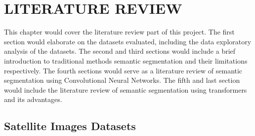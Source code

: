 
\chapter{LITERATURE REVIEW}
\label{chapter: 2}

This chapter would cover the literature review part of this project. The first section would elaborate on the datasets evaluated, including the data exploratory analysis of the datasets.  The second and third sections would include a brief introduction to traditional methods semantic segmentation and their limitations respectively. The fourth sections would serve as a literature review of semantic segmentation using Convolutional Neural Networks. The fifth and last section would include the literature review of semantic segmentation using transformers and its advantages.

\section{Satellite Images Datasets}

